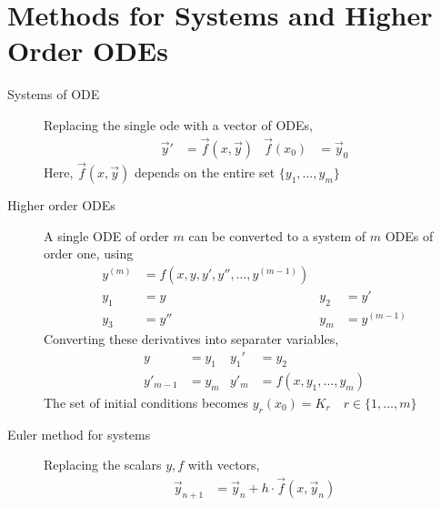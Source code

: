 \section{Methods for Systems and Higher Order ODEs}

\begin{description}
    \item[Systems of ODE] Replacing the single ode with a vector of ODEs,
        \begin{align}
            \vec{y}' & = \vec{f}(x, \vec{y}) & \vec{f}(x_0) & = \vec{y}_0
        \end{align}
        Here, $ \vec{f}(x, \vec{y}) $ depends on the entire set $ \{y_1,\dots,y_m\} $

    \item[Higher order ODEs] A single ODE of order $ m $ can be converted to a system of
        $ m $ ODEs of order one, using
        \begin{align}
            y^{(m)} & = f(x, y, y', y'', \dots, y^{(m-1)})                       \\
            y_1     & = y                                  & y_2   & = y'        \\
            y_3     & = y''                                & y_{m} & = y^{(m-1)}
        \end{align}
        Converting these derivatives into separater variables,
        \begin{align}
            y        & = y_1 & y_1' & = y_2                \\
            y'_{m-1} & = y_m & y'_m & = f(x,y_1,\dots,y_m)
        \end{align}
        The set of initial conditions becomes $ y_r(x_0) = K_r \quad r \in\{1,\dots,m\}$

    \item[Euler method for systems] Replacing the scalars $ y, f $ with vectors,
        \begin{align}
            \vec{y}_{n+1} & = \vec{y}_n + h \cdot \vec{f}(x, \vec{y}_n)
        \end{align}


\end{description}
